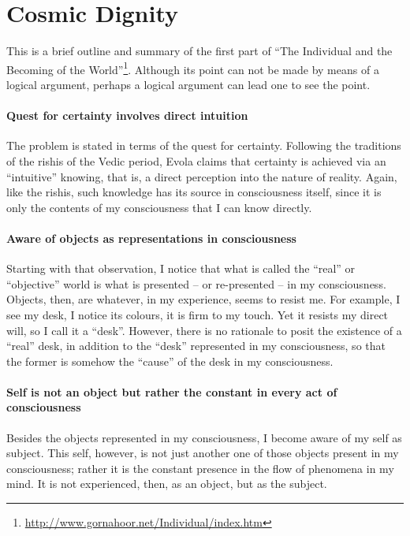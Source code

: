 \section{Cosmic Dignity}

This is a brief outline and summary of the first part of ``The Individual and the Becoming of the World''\footnote{\url{http://www.gornahoor.net/Individual/index.htm}}. Although its point can not be made by means of a logical argument, perhaps a logical argument can lead one to see the point.

\paragraph{Quest for certainty involves direct intuition}


The problem is stated in terms of the quest for certainty. Following the traditions of the rishis of the Vedic period, Evola claims that certainty is achieved via an ``intuitive'' knowing, that is, a direct perception into the nature of reality. Again, like the rishis, such knowledge has its source in consciousness itself, since it is only the contents of my consciousness that I can know directly.

\paragraph{Aware of objects as representations in consciousness}


Starting with that observation, I notice that what is called the ``real'' or ``objective'' world is what is presented -- or re-presented -- in my consciousness. Objects, then, are whatever, in my experience, seems to resist me. For example, I see my desk, I notice its colours, it is firm to my touch. Yet it resists my direct will, so I call it a ``desk''. However, there is no rationale to posit the existence of a ``real'' desk, in addition to the ``desk'' represented in my consciousness, so that the former is somehow the ``cause'' of the desk in my consciousness.

\paragraph{Self is not an object but rather the constant in every act of consciousness}


Besides the objects represented in my consciousness, I become aware of my self as subject. This self, however, is not just another one of those objects present in my consciousness; rather it is the constant presence in the flow of phenomena in my mind. It is not experienced, then, as an object, but as the subject.

